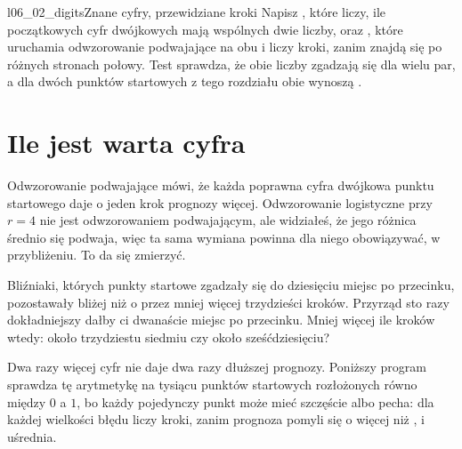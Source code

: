
\begin{lab}{l06_02_digits}{Znane cyfry, przewidziane kroki}
Napisz , które liczy, ile początkowych cyfr dwójkowych
mają wspólnych dwie liczby, oraz , które uruchamia
odwzorowanie podwajające na obu i liczy kroki, zanim znajdą się po różnych
stronach połowy. Test sprawdza, że obie liczby zgadzają się dla wielu par, a
dla dwóch punktów startowych z tego rozdziału obie wynoszą
.
\end{lab}

\section{Ile jest warta cyfra}
\label{sec:ch06-worth}

\noindent
Odwzorowanie podwajające mówi, że każda poprawna cyfra dwójkowa punktu
startowego daje o jeden krok prognozy więcej. Odwzorowanie logistyczne przy
$r = 4$ nie jest odwzorowaniem podwajającym, ale widziałeś, że jego różnica
średnio się podwaja, więc ta sama wymiana powinna dla niego obowiązywać, w
przybliżeniu. To da się zmierzyć.

\begin{think}
Bliźniaki, których punkty startowe zgadzały się do dziesięciu miejsc po
przecinku, pozostawały bliżej niż o  przez mniej więcej
trzydzieści kroków. Przyrząd sto razy dokładniejszy dałby ci dwanaście
miejsc po przecinku. Mniej więcej ile kroków wtedy: około trzydziestu
siedmiu czy około sześćdziesięciu?
\end{think}
Dwa razy więcej cyfr nie daje dwa razy dłuższej prognozy. Poniższy program
sprawdza tę arytmetykę na tysiącu punktów startowych rozłożonych równo
między $0$ a $1$, bo każdy pojedynczy punkt może mieć szczęście albo pecha:
dla każdej wielkości błędu liczy kroki, zanim prognoza pomyli się o więcej
niż , i uśrednia.


